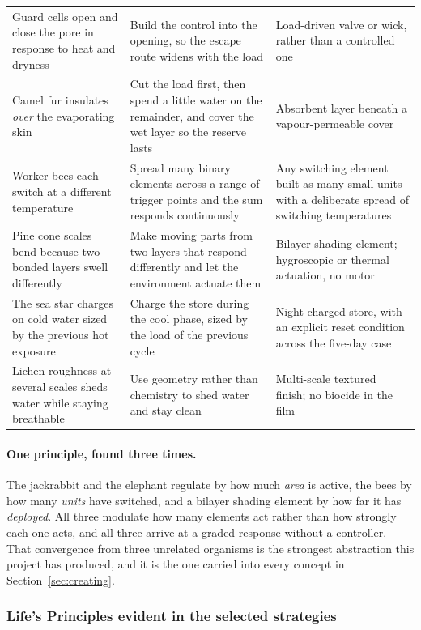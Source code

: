 \begin{table}[htbp]
\begin{tabularx}{\textwidth}{X X X}
Guard cells open and close the pore in response to heat and dryness
& Build the control into the opening, so the escape route widens with the load
& Load-driven valve or wick, rather than a controlled one \\
Camel fur insulates \emph{over} the evaporating skin
& Cut the load first, then spend a little water on the remainder, and cover the
wet layer so the reserve lasts
& Absorbent layer beneath a vapour-permeable cover \\
Worker bees each switch at a different temperature
& Spread many binary elements across a range of trigger points and the sum
responds continuously
& Any switching element built as many small units with a deliberate spread of
switching temperatures \\
Pine cone scales bend because two bonded layers swell differently
& Make moving parts from two layers that respond differently and let the
environment actuate them
& Bilayer shading element; hygroscopic or thermal actuation, no motor \\
The sea star charges on cold water sized by the previous hot exposure
& Charge the store during the cool phase, sized by the load of the previous cycle
& Night-charged store, with an explicit reset condition across the five-day case \\
Lichen roughness at several scales sheds water while staying breathable
& Use geometry rather than chemistry to shed water and stay clean
& Multi-scale textured finish; no biocide in the film \\
\bottomrule
\end{tabularx}
\end{table}

\paragraph{One principle, found three times.} The jackrabbit and the elephant
regulate by how much \emph{area} is active, the bees by how many \emph{units}
have switched, and a bilayer shading element by how far it has \emph{deployed}.
All three modulate how many elements act rather than how strongly each one acts,
and all three arrive at a graded response without a controller. That convergence
from three unrelated organisms is the strongest abstraction this project has
produced, and it is the one carried into every concept in
Section~\ref{sec:creating}.

\subsubsection{Life's Principles evident in the selected strategies}


